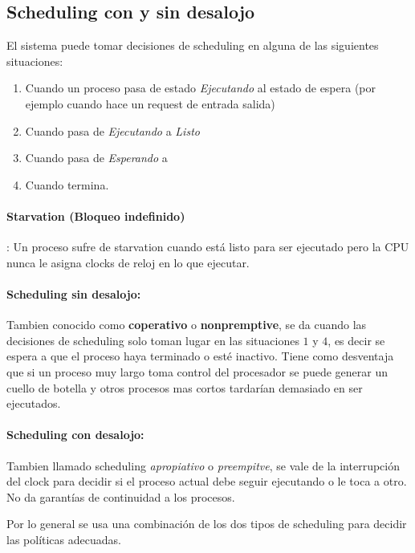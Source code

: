     \subsection{Scheduling con y sin desalojo}
    
    El sistema puede tomar decisiones de scheduling en alguna de las siguientes situaciones:
    \begin{enumerate}
        \item Cuando un proceso pasa de estado \textit{Ejecutando} al estado de espera (por ejemplo cuando hace un request de entrada salida)
        \item Cuando pasa de \textit{Ejecutando} a \textit{Listo}
        \item Cuando pasa de \textit{Esperando} a 
        \item Cuando termina.
    \end{enumerate}
    
    \paragraph{Starvation (Bloqueo indefinido)}: Un proceso sufre de starvation cuando está listo para ser ejecutado pero la CPU nunca le asigna clocks de reloj en lo que ejecutar.
    
    \paragraph{Scheduling sin desalojo:} Tambien conocido como \textbf{coperativo} o \textbf{nonpremptive}, se da cuando las decisiones de scheduling solo toman lugar en las situaciones $1$ y $4$, es decir se espera a que el proceso haya terminado o esté inactivo. Tiene como desventaja que si un proceso muy largo toma control del procesador se puede generar un cuello de botella y otros procesos mas cortos tardarían demasiado en ser ejecutados.
    
    \paragraph{Scheduling con desalojo:} Tambien llamado scheduling \textit{apropiativo} o \textit{preempitve}, se vale de la interrupción del clock para decidir si el proceso actual debe seguir ejecutando o le toca a otro. No da garantías de continuidad a los procesos.
    
    Por lo general se usa una combinación de los dos tipos de scheduling para decidir las políticas adecuadas.

